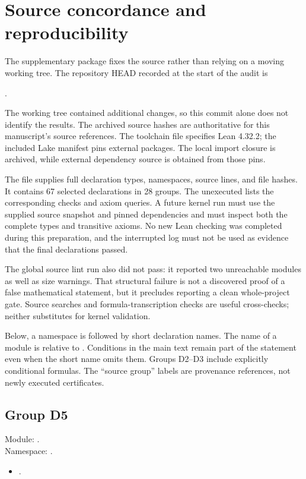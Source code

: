 \section{Source concordance and reproducibility}\label{app:cert}

The supplementary package fixes the source rather than relying on a moving working tree. The repository HEAD recorded at the start of the audit is
\begin{center}.\end{center}
The working tree contained additional changes, so this commit alone does not identify the results. The archived source hashes are authoritative for this manuscript's source references. The toolchain file specifies Lean 4.32.2; the included Lake manifest pins external packages. The local import closure is archived, while external dependency source is obtained from those pins.

The file  supplies full declaration types, namespaces, source lines, and file hashes. It contains 67 selected declarations in 28 groups. The unexecuted  lists the corresponding checks and axiom queries. A future kernel run must use the supplied source snapshot and pinned dependencies and must inspect both the complete types and transitive axioms. No new Lean checking was completed during this preparation, and the interrupted log must not be used as evidence that the final declarations passed.

The global source lint run also did not pass: it reported two unreachable modules as well as size warnings. That structural failure is not a discovered proof of a false mathematical statement, but it precludes reporting a clean whole-project gate. Source searches and formula-transcription checks are useful cross-checks; neither substitutes for kernel validation.

Below, a namespace is followed by short declaration names. The name of a module is relative to . Conditions in the main text remain part of the statement even when the short name omits them. Groups D2--D3 include explicitly conditional formulas. The ``source group'' labels are provenance references, not newly executed certificates.

\subsection*{Group D5}\label{cert:D5}
\noindent Module: .\\
Namespace: .
\begin{itemize}
\item {}.
\end{itemize}

